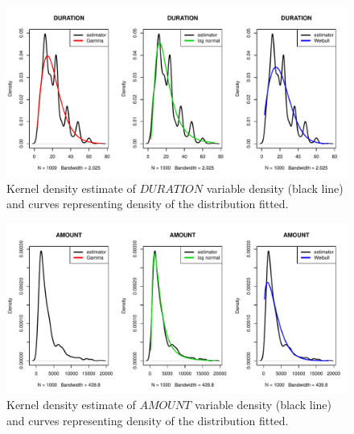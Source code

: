 \documentclass[10pt]{article}\usepackage[]{graphicx}\usepackage[]{color}
\newenvironment{knitrout}{}{} %
\begin{document}
\begin{figure}[h!]
\centering
\begin{knitrout}
\color{fgcolor}
\includegraphics[width=.95\linewidth]{figure/unnamed-chunk-3-1} 

\end{knitrout}
\caption{Kernel density estimate of $DURATION$ variable density (black line) and curves representing density of the distribution fitted.}
\end{figure}

\begin{figure}[h!]
\centering
\begin{knitrout}
\color{fgcolor}
\includegraphics[width=.95\linewidth]{figure/unnamed-chunk-4-1} 

\end{knitrout}
\caption{Kernel density estimate of $AMOUNT$ variable density (black line) and curves representing density of the distribution fitted.}
\end{figure}
\end{document}
